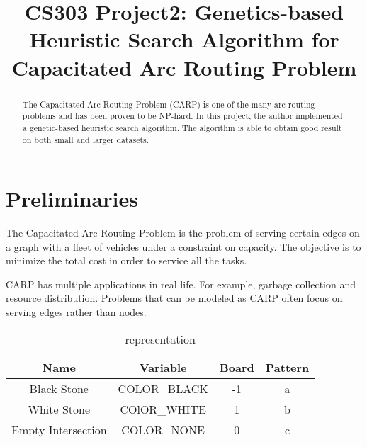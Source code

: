 \documentclass[conference]{IEEEtran}
\begin{document}
  
  \title{CS303 Project2: Genetics-based Heuristic Search Algorithm for Capacitated Arc Routing Problem}
  
  \author{
  }
  
  \maketitle
  
  \begin{abstract}
  The Capacitated Arc Routing Problem (CARP) is one of the many arc routing problems and has been proven to be NP-hard. In this project, the author implemented a genetic-based heuristic search algorithm. The algorithm is able to obtain good result on both small and larger datasets.
  \end{abstract}
  \IEEEpeerreviewmaketitle
  
  \section{Preliminaries}

    The Capacitated Arc Routing Problem  is the problem of serving certain edges on a graph with a fleet of vehicles under a constraint on capacity\cite{Wohlk2008}. The objective is to minimize the total cost in order to service all the tasks.

    CARP has multiple applications in real life. For example, garbage collection and resource distribution. Problems that can be modeled as CARP often focus on serving edges rather than nodes.

	\begin{table}[H]
	\caption{representation}
	\centering
    \begin{tabular}{cccc}
    \toprule
    Name&Variable&Board&Pattern\\
    \midrule
    Black Stone&COLOR\_BLACK&-1&a\\
    White Stone&COlOR\_WHITE&1&b\\
    Empty Intersection&COLOR\_NONE&0&c\\
	\bottomrule
	\end{tabular}
	\label{table:1}
	\end{table}
  
\end{document}
